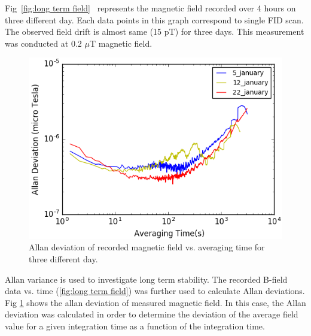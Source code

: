 Fig~\ref{fig:long term field} ~represents the magnetic field recorded over 4 hours on three different day. Each data points in this graph correspond to single FID scan. The observed field drift is almost same (15 pT) for three days. This measurement was conducted at 0.2 $\mu$T magnetic field.
\begin{figure}[h]
\centering\includegraphics[width=0.8\linewidth]{figures/field_3_day_allan.png}
\caption{Allan deviation of recorded magnetic field vs. averaging time for three different day.\label{fig:allan_deviation}}
\end{figure}

 Allan variance is used to investigate long term stability. The recorded B-field data vs. time (\ref{fig:long term field}) was further used to calculate Allan deviations. Fig \ref{fig:allan_deviation} shows the allan deviation of measured magnetic field.  In this case, the Allan deviation was calculated in order to determine the deviation of the average field value for a given integration time as a function of the integration time\cite{doe:website2}.

  
